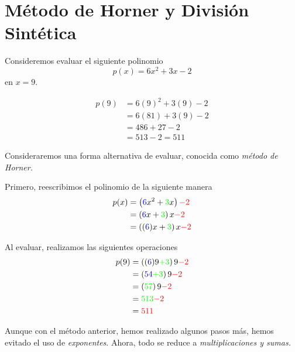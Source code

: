 \section{M\'etodo de Horner y Divisi\'on Sint\'etica}


	\begin{problema}
		Consideremos evaluar el siguiente polinomio
		$$
		p(x)=6x^{2}+3x-2
		$$ en $x=9.$
	\end{problema}
	



	\begin{align*}
		p(9)&=6(9)^{2}+3(9)-2  \\
		&=6(81)+3(9)-2  \\
		&=486+27-2  \\
		&=513-2=511
	\end{align*}
	



	Consideraremos una forma alternativa de evaluar, conocida como \emph{m\'etodo de Horner.}



	Primero, reescribimos el polinomio de la siguiente manera 
	\begin{align*}
		p(x)&=\left( \textcolor{blue}{6}x^{2} + \textcolor{green}{3}x \right) \textcolor{red}{-2}\\
		&= \left( \textcolor{blue}{6}x+\textcolor{green}{3} \right)x\textcolor{red}{-2} \\
		&= \left( (\textcolor{blue}{6}) x + \textcolor{green}{3} \right) x \textcolor{red}{-2}
	\end{align*}
	



	Al evaluar, realizamos las siguientes operaciones
	\begin{align*}
		p(9)&=\left( (\textcolor{blue}{6}) 9  \textcolor{green}{+3} \right) 9 \textcolor{red}{-2}\\
		&=\left( \textcolor{blue}{54} \textcolor{green}{+3} \right)9\textcolor{red}{-2} \\
		&= \left( \textcolor{green}{57} \right)9\textcolor{red}{-2}\\
		&=\textcolor{green}{513}\textcolor{red}{-2}\\
		&=\textcolor{red}{511}
	\end{align*}
	



	\begin{rem}
		Aunque con el m\'etodo anterior, hemos realizado algunos pasos más, hemos evitado el uso de \emph{exponentes}.  Ahora, todo se reduce a \emph{multiplicaciones y sumas.}
	\end{rem}
	



